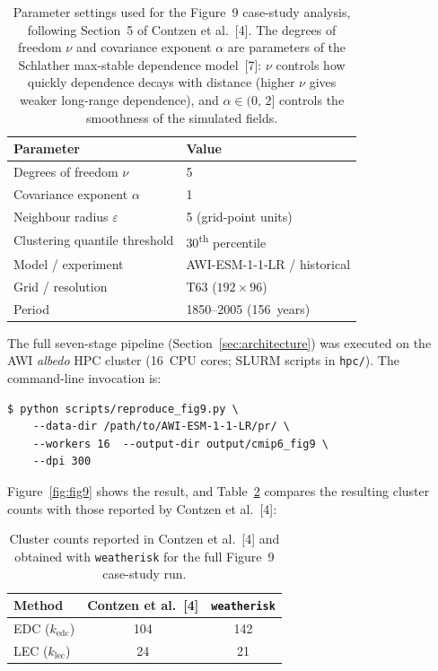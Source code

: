\documentclass[preprint,12pt,a4paper]{elsarticle}
\newcommand{\rev}[1]{{#1}}
\newcommand{\revb}[1]{{#1}}
\newcommand{\revo}[1]{{#1}}
\begin{document}
\begin{table}[ht]
\centering
\begin{tabular}{ll}
\toprule
\textbf{Parameter} & \textbf{Value} \\
\midrule
Degrees of freedom $\nu$ & 5 \\
Covariance exponent $\alpha$ & 1 \\
Neighbour radius $\varepsilon$ & 5 (grid-point units) \\
Clustering quantile threshold & 30\textsuperscript{th} percentile \\
Model / experiment & AWI-ESM-1-1-LR / historical \\
Grid / resolution & T63 ($192 \times 96$) \\
Period & 1850--2005 (156~years) \\
\bottomrule
\end{tabular}
\caption{Parameter settings used for the Figure~9 \revb{case-study analysis},
  following Section~5 of Contzen et al.~[4]. \revo{The degrees of
  freedom $\nu$ and covariance exponent $\alpha$ are parameters of
  the Schlather max-stable dependence model~[7]: $\nu$ controls
  how quickly dependence decays with distance (higher $\nu$ gives
  weaker long-range dependence), and $\alpha \in (0,\,2]$
  controls the smoothness of the simulated fields.}}
\label{tab:fig9-params}
\end{table}

\rev{The full seven-stage pipeline (Section~\ref{sec:architecture}) was
executed on the AWI \emph{albedo} HPC cluster (16~CPU cores;
SLURM scripts in \texttt{hpc/}). The command-line invocation is:}

\begin{lstlisting}[caption={\revb{Running the Figure~9 case study on HPC}.},
  label=lst:fig9, numbers=none]
$ python scripts/reproduce_fig9.py \
    --data-dir /path/to/AWI-ESM-1-1-LR/pr/ \
    --workers 16  --output-dir output/cmip6_fig9 \
    --dpi 300
\end{lstlisting}

\rev{Figure~\ref{fig:fig9} shows the result, and
Table~\ref{tab:fig9-counts} compares the resulting cluster counts with
those reported by Contzen et al.~[4]:}

\begin{table}[ht]
\centering
\begin{tabular}{lcc}
\toprule
\textbf{Method} & \textbf{Contzen et al.~[4]} &
  \textbf{\texttt{weatherisk}} \\
\midrule
EDC ($k_{\text{edc}}$) & 104 & 142 \\
LEC ($k_{\text{lec}}$) & 24 & 21 \\
\bottomrule
\end{tabular}
\caption{Cluster counts reported in Contzen et al.~[4] and obtained
  with \texttt{weatherisk} for the full Figure~9 \revb{case-study run}.}
\label{tab:fig9-counts}
\end{table}
\end{document}
